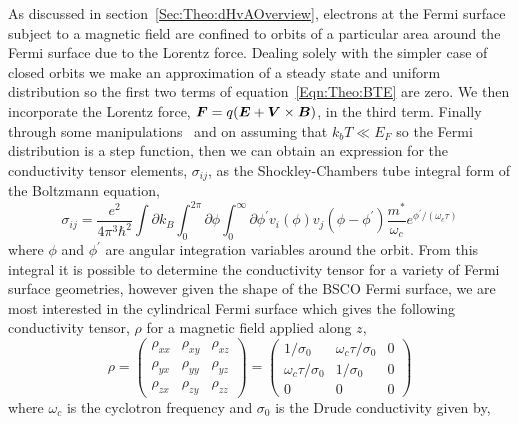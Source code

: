 As discussed in section~\ref{Sec:Theo:dHvAOverview}, electrons at the Fermi surface subject to a magnetic field are confined to orbits of a particular area around the Fermi surface due to the Lorentz force. Dealing solely with the simpler case of closed orbits we make an approximation of a steady state and uniform distribution so the first two terms of equation~\ref{Eqn:Theo:BTE} are zero. We then incorporate the Lorentz force, $\boldsymbol{F} = q(\boldsymbol{E} + \boldsymbol{V}\times\boldsymbol{B})$, in the third term. Finally through some manipulations~\cite{French2009} and on assuming that $k_bT \ll E_F$ so the Fermi distribution is a step function, then we can obtain an expression for the conductivity tensor elements, $\sigma_{ij}$, as the Shockley-Chambers tube integral form of the Boltzmann equation,
\begin{equation}
    \sigma_{ij} = \frac{e^2}{4 \pi^3 \hbar^2}\int \partial k_B \int^{2\pi}_{0} \partial \phi \int^{\infty}_{0} \partial \phi^{\prime} v_i(\phi) v_j(\phi - \phi^{\prime})\frac{m^*}{\omega_c}e^{\phi^{\prime}/(\omega_c \tau)}
\end{equation}
where $\phi$ and $\phi^{\prime}$ are angular integration variables around the orbit. From this integral it is possible to determine the conductivity tensor for a variety of Fermi surface geometries, however given the shape of the \ac{BSCO} Fermi surface, we are most interested in the cylindrical Fermi surface which gives the following conductivity tensor, $\rho$ for a magnetic field applied along $z$,
\begin{equation}
    \rho = \left( \begin{array}{ccc}
                \rho_{xx}   & \rho_{xy} & \rho_{xz} \\
                \rho_{yx}   & \rho_{yy} & \rho_{yz} \\
                \rho_{zx}   & \rho_{zy} & \rho_{zz} \end{array} \right) = \left( \begin{array}{ccc}
                                                        1/\sigma_0  & \omega_c \tau / \sigma_0   & 0  \\
                                                        \omega_c \tau / \sigma_0  & 1/\sigma_0  & 0  \\
                                                        0   & 0 & 0  \end{array} \right)
\end{equation}
where $\omega_c$ is the cyclotron frequency and $\sigma_0$ is the Drude conductivity given by,
